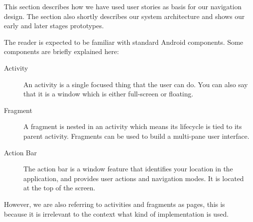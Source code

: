 This section describes how we have used user stories as basis for our navigation design. The section also shortly describes our system architecture and shows our early and later stages prototypes.

The reader is expected to be familiar with standard Android components. Some components are briefly explained here:
\begin{description}
\item[Activity] An activity is a single focused thing that the user can do. You can also say that it is a window which is either full-screen or floating. \citep{activity}
\item[Fragment] A fragment is nested in an activity which means its lifecycle is tied to its parent activity. Fragments can be used to build a multi-pane user interface. \citep{fragment}
\item[Action Bar] The action bar is a window feature that identifies your location in the application, and provides user actions and navigation modes. It is located at the top of the screen. \citep{actionbar}
\end{description}

However, we are also referring to activities and fragments as pages, this is because it is irrelevant to the context what kind of implementation is used.